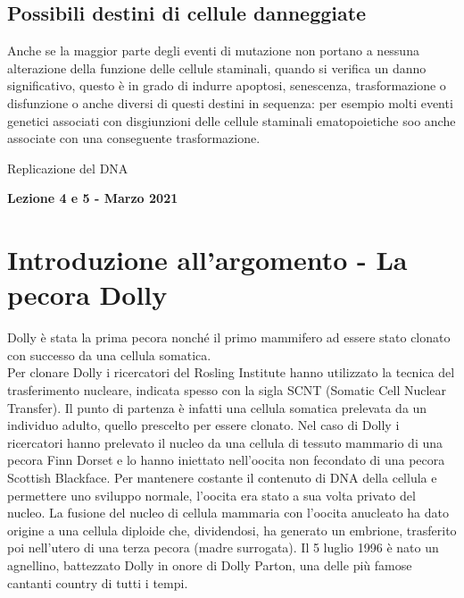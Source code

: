 \documentclass{article}
\begin{document}
\subsection{Possibili destini di cellule danneggiate}
Anche se la maggior parte degli eventi di mutazione non portano a nessuna alterazione della funzione delle cellule staminali, quando si verifica un danno significativo, questo è in grado di indurre apoptosi, senescenza, trasformazione o disfunzione o anche diversi di questi destini in sequenza: per esempio molti eventi genetici associati con disgiunzioni delle cellule staminali ematopoietiche soo anche associate con una conseguente trasformazione.

\begin{titlepage}
    \begin{center}
        \vspace*{1cm}
        \LARGE
        Replicazione del DNA
            
        \vspace{1.5cm}
        
        \Large
        \textbf{Lezione 4 e 5 - Marzo 2021}

        \vspace{0.8cm}

    \end{center}
\end{titlepage}
\setcounter{page}{5}
\section{Introduzione all'argomento - La pecora Dolly}
Dolly è stata la prima pecora nonché il primo mammifero ad essere stato clonato con successo da una cellula somatica.  \\
Per clonare Dolly i ricercatori del Rosling Institute hanno utilizzato la tecnica del trasferimento nucleare, indicata spesso con la sigla SCNT (Somatic Cell Nuclear Transfer). Il punto di partenza è infatti una cellula somatica prelevata da un individuo adulto, quello prescelto per essere clonato. Nel caso di Dolly i ricercatori hanno prelevato il nucleo da una cellula di tessuto mammario di una pecora Finn Dorset e lo hanno iniettato nell'oocita non fecondato di una pecora Scottish Blackface. Per mantenere costante il contenuto di DNA della cellula e permettere uno sviluppo normale, l'oocita era stato a sua volta privato del nucleo. La fusione del nucleo di cellula mammaria con l'oocita anucleato ha dato origine a una cellula diploide che, dividendosi, ha generato un embrione, trasferito poi nell'utero di una terza pecora (madre surrogata). Il 5 luglio 1996 è nato un agnellino, battezzato Dolly in onore di Dolly Parton, una delle più famose cantanti country di tutti i tempi. 
\end{document}

